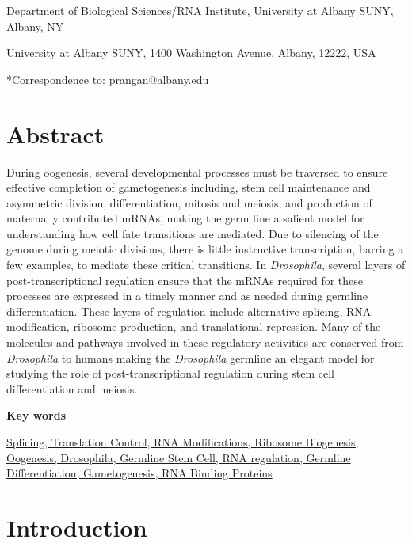 \documentclass[12pt,oneside]{reedthesis}
\begin{document}
Department of Biological Sciences/RNA Institute, University at Albany
SUNY, Albany, NY

University at Albany SUNY, 1400 Washington Avenue, Albany, 12222, USA

*Correspondence to: prangan@albany.edu

\hypertarget{abstract}{%
\section{Abstract}\label{abstract}}

During oogenesis, several developmental processes must be traversed to
ensure effective completion of gametogenesis including, stem cell
maintenance and asymmetric division, differentiation, mitosis and
meiosis, and production of maternally contributed mRNAs, making the germ
line a salient model for understanding how cell fate transitions are
mediated. Due to silencing of the genome during meiotic divisions, there
is little instructive transcription, barring a few examples, to mediate
these critical transitions. In \emph{Drosophila}, several layers of
post-transcriptional regulation ensure that the mRNAs required for these
processes are expressed in a timely manner and as needed during germline
differentiation. These layers of regulation include alternative
splicing, RNA modification, ribosome production, and translational
repression. Many of the molecules and pathways involved in these
regulatory activities are conserved from \emph{Drosophila} to humans making
the \emph{Drosophila} germline an elegant model for studying the role of
post-transcriptional regulation during stem cell differentiation and
meiosis.

\textbf{Key words}

\underline{Splicing, Translation Control, RNA Modifications, Ribosome Biogenesis,
Oogenesis, Drosophila, Germline Stem Cell, RNA regulation, Germline
Differentiation, Gametogenesis, RNA Binding Proteins}

\hypertarget{introduction-1}{%
\section{Introduction}\label{introduction-1}}
\end{document}
